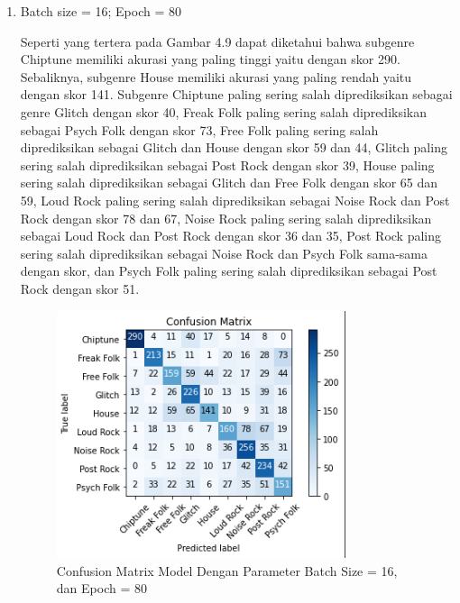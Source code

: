 \begin{enumerate}
	\item Batch size = 16; Epoch = 80
	
	Seperti yang tertera pada Gambar 4.9 dapat diketahui bahwa subgenre Chiptune memiliki akurasi yang paling tinggi yaitu dengan skor 290. Sebaliknya, subgenre House memiliki akurasi yang paling rendah yaitu dengan skor 141. Subgenre Chiptune paling sering salah diprediksikan sebagai genre Glitch dengan skor 40, Freak Folk paling sering salah diprediksikan sebagai Psych Folk dengan skor 73, Free Folk paling sering salah diprediksikan sebagai Glitch dan House dengan skor 59 dan 44, Glitch paling sering salah diprediksikan sebagai Post Rock dengan skor 39, House paling sering salah diprediksikan sebagai Glitch dan Free Folk dengan skor 65 dan 59, Loud Rock paling sering salah diprediksikan sebagai Noise Rock dan Post Rock dengan skor 78 dan 67, Noise Rock paling sering salah diprediksikan sebagai Loud Rock dan Post Rock dengan skor 36 dan 35, Post Rock paling sering salah diprediksikan sebagai Noise Rock dan Psych Folk sama-sama dengan skor, dan Psych Folk paling sering salah diprediksikan sebagai Post Rock dengan skor 51.
	
	\begin{figure}[H]
		\centering
		
		\includegraphics[width=0.8\textwidth]{gambar/confusion matrix_b16_e80}
		
		\caption{Confusion Matrix Model Dengan Parameter Batch Size = 16, dan Epoch = 80}
		\label{fig:cm_b16_e80}
	\end{figure}


\end{enumerate}

